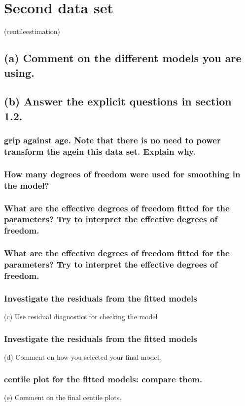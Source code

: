 \section{Second data set}

(centileestimation)

\subsection{(a) Comment on the different models you are using.}

\subsection{(b) Answer the explicit questions in section 1.2.}

\subsubsection{grip against age. Note that there is no need to power transform the agein this data set. Explain why.}

\subsubsection{How many degrees of freedom were used for smoothing in the model? }

\subsubsection{What are the effective degrees of freedom fitted for the parameters? Try to interpret the effective degrees of freedom.}

\subsubsection{What are the effective degrees of freedom fitted for the parameters? Try to interpret the effective degrees of freedom.}

\subsubsection{Investigate the residuals from the fitted models}

(c) Use residual diagnostics for checking the model

\subsubsection{Investigate the residuals from the fitted models}
(d) Comment on how you selected your final model.

\subsubsection{centile plot for the fitted models: compare them.}

(e) Comment on the final centile plots.

